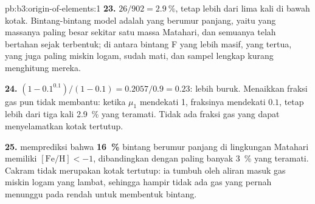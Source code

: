 \begin{solution}{pb:b3:origin-of-elements:1}
\textbf{23.} $26/902 = \qty{2.9}{\percent}$, tetap lebih dari lima kali di bawah
kotak. Bintang-bintang model adalah yang berumur panjang, yaitu yang massanya paling
besar sekitar satu massa Matahari, dan semuanya telah bertahan sejak terbentuk; di
antara bintang F yang lebih masif, yang tertua, yang juga paling miskin logam, sudah
mati, dan sampel lengkap kurang menghitung mereka.

\textbf{24.} $(1 - 0.1^{0.1})/(1 - 0.1) = 0.2057/0.9 = \num{0.23}$: lebih buruk.
Menaikkan fraksi gas pun tidak membantu: ketika $\mu_1$ mendekati 1,
fraksinya mendekati $0.1$, tetap lebih dari tiga kali
\qty{2.9}{\percent} yang teramati. Tidak ada fraksi gas yang dapat menyelamatkan kotak tertutup.

\textbf{25.}  memprediksi bahwa
\textbf{\qty[text-series-to-math=true]{16}{\percent}} bintang berumur panjang
di lingkungan Matahari memiliki $[\mathrm{Fe/H}] < -1$, dibandingkan dengan
paling banyak \qty{3}{\percent} yang teramati. Cakram tidak merupakan kotak tertutup:
ia tumbuh oleh aliran masuk gas miskin logam yang lambat, sehingga hampir tidak ada gas
yang pernah menunggu pada  rendah untuk membentuk bintang.
\end{solution}
